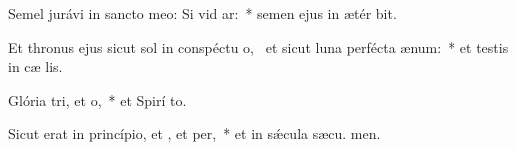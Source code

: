 \item Semel jurávi in sancto meo: Si vid ar:~* semen ejus in ætér bit.
\item Et thronus ejus sicut sol in conspéctu o,~\pscross{} et sicut luna perfécta  ænum:~* et testis in cæ lis.
\item Glória tri, et o,~* et Spirí to.
\item Sicut erat in princípio, et , et per,~* et in sǽcula sæcu. men.
